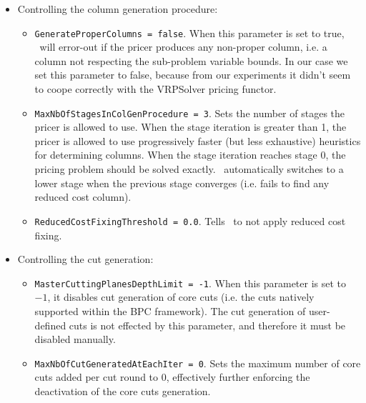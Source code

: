 \begin{itemize}
	\item Controlling the column generation procedure:
	      \begin{itemize}
		      \item \texttt{GenerateProperColumns = false}.
		            When this parameter is set to true, \bapcod\ will error-out if the pricer produces any non-proper column,
		            i.e. a column not respecting the sub-problem variable bounds.
		            In our case we set this parameter to false, because from our experiments it didn't seem to coope correctly with the VRPSolver pricing functor.
		      \item \texttt{MaxNbOfStagesInColGenProcedure = 3}.
		            Sets the number of stages the pricer is allowed to use.
		            When the stage iteration is greater than 1, the pricer is allowed to use
		            progressively faster (but less exhaustive) heuristics for determining columns.
		            When the stage iteration reaches stage 0, the pricing problem should be solved exactly.
		            \bapcod\ automatically switches to a lower stage when the previous stage converges (i.e. fails to find any reduced cost column).
		      \item \texttt{ReducedCostFixingThreshold = 0.0}.
		            Tells \bapcod\ to not apply reduced cost fixing.
	      \end{itemize}

	\item Controlling the cut generation:
	      \begin{itemize}
		      \item \texttt{MasterCuttingPlanesDepthLimit = -1}.
		            When this parameter is set to $-1$, it disables cut generation of core cuts
		            (i.e. the cuts natively supported within the BPC framework).
		            The cut generation of user-defined cuts
		            is not effected by this parameter, and therefore it must be disabled manually.
		      \item \texttt{MaxNbOfCutGeneratedAtEachIter = 0}.
		            Sets the maximum number of core cuts added per cut round to $0$,
		            effectively further enforcing the deactivation of the core cuts generation.
	      \end{itemize}


\end{itemize}
